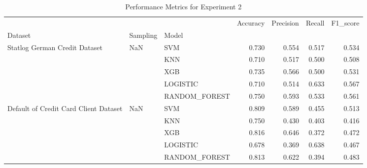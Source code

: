 \begin{table}
\caption{Performance Metrics for Experiment 2}
\label{tab:experiment_2_results}
\begin{tabular}{lllrrrr}
\toprule
 &  &  & Accuracy & Precision & Recall & F1\_score \\
Dataset & Sampling & Model &  &  &  &  \\
\midrule
\multirow[t]{5}{*}{Statlog German Credit Dataset} & \multirow[t]{5}{*}{NaN} & SVM & 0.730 & 0.554 & 0.517 & 0.534 \\
 &  & KNN & 0.710 & 0.517 & 0.500 & 0.508 \\
 &  & XGB & 0.735 & 0.566 & 0.500 & 0.531 \\
 &  & LOGISTIC & 0.710 & 0.514 & 0.633 & 0.567 \\
 &  & RANDOM\_FOREST & 0.750 & 0.593 & 0.533 & 0.561 \\
\cline{1-7} \cline{2-7}
\multirow[t]{5}{*}{Default of Credit Card Client Dataset} & \multirow[t]{5}{*}{NaN} & SVM & 0.809 & 0.589 & 0.455 & 0.513 \\
 &  & KNN & 0.750 & 0.430 & 0.403 & 0.416 \\
 &  & XGB & 0.816 & 0.646 & 0.372 & 0.472 \\
 &  & LOGISTIC & 0.678 & 0.369 & 0.638 & 0.467 \\
 &  & RANDOM\_FOREST & 0.813 & 0.622 & 0.394 & 0.483 \\
\cline{1-7} \cline{2-7}
\bottomrule
\end{tabular}
\end{table}
